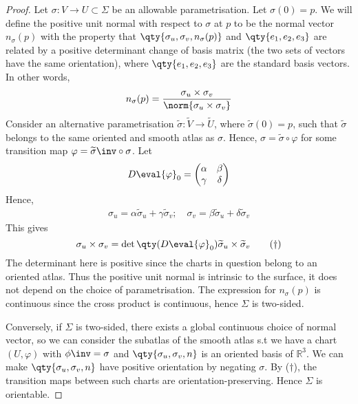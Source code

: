 \begin{proof}
	Let $\sigma \colon V \to U \subset \Sigma$ be an allowable parametrisation.
	Let $\sigma(0) = p$.
	We will define the positive unit normal with respect to $\sigma$ at $p$ to be the normal vector $n_\sigma(p)$ with the property that $\qty{\sigma_u, \sigma_v, n_\sigma(p)}$ and $\qty{e_1, e_2, e_3}$ are related by a positive determinant change of basis matrix (the two sets of vectors have the same orientation), where $\qty{e_1, e_2, e_3}$ are the standard basis vectors.
	In other words,
	\begin{align*}
		n_\sigma(p) = \frac{\sigma_u \times \sigma_v}{\norm{\sigma_u \times \sigma_v}}
	\end{align*}
	Consider an alternative parametrisation $\widetilde \sigma \colon \widetilde V \to \widetilde U$, where $\widetilde \sigma(0) = p$, such that $\widetilde \sigma$ belongs to the same oriented and smooth atlas as $\sigma$.
	Hence, $\sigma = \widetilde \sigma \circ \varphi$ for some transition map $\varphi = \widetilde \sigma\inv \circ \sigma$.
	Let
	\begin{align*}
		D \eval{\varphi}_0 = \begin{pmatrix}
			\alpha & \beta  \\
			\gamma & \delta
		\end{pmatrix}
	\end{align*}
	Hence,
	\begin{align*}
		\sigma_u = \alpha \widetilde \sigma_u + \gamma \widetilde \sigma_v;\quad \sigma_v = \beta \widetilde \sigma_u + \delta \widetilde \sigma_v
	\end{align*}
	This gives
	\begin{equation}
		\sigma_u \times \sigma_v = \det\qty(D \eval{\varphi}_0) \widetilde \sigma_u \times \widetilde \sigma_v \tag{$\dagger$}
	\end{equation}
	The determinant here is positive since the charts in question belong to an oriented atlas.
	Thus the positive unit normal is intrinsic to the surface, it does not depend on the choice of parametrisation.
	The expression for $n_\sigma(p)$ is continuous since the cross product is continuous, hence $\Sigma$ is two-sided.

	Conversely, if $\Sigma$ is two-sided, there exists a global continuous choice of normal vector, so we can consider the subatlas of the smooth atlas s.t we have a chart $(U,\varphi)$ with $\phi\inv = \sigma$ and $\qty{\sigma_u, \sigma_v, n}$ is an oriented basis of $\mathbb{R}^3$.
	We can make $\qty{\sigma_u, \sigma_v, n}$ have positive orientation by negating $\sigma$.
	By ($\dagger$), the transition maps between such charts are orientation-preserving.
	Hence $\Sigma$ is orientable.
\end{proof}

